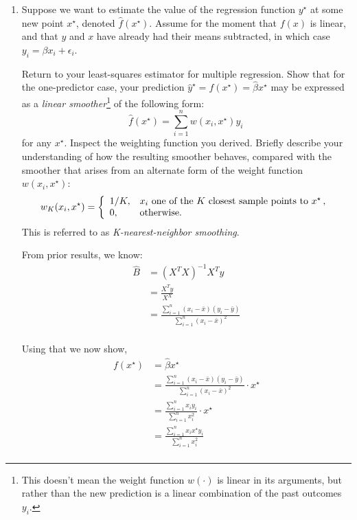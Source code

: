 \documentclass{homework}
\newcommand{\1}{\mathbf{1}}
\begin{document}
\begin{enumerate}[label=(\Alph*)]
\item Suppose we want to estimate the value of the regression function $y^{\star}$ at some new point $x^\star$, denoted $\hat{f}(x^{\star})$.  Assume for the moment that $f(x)$ is linear, and that $y$ and $x$ have already had their means subtracted, in which case $y_i = \beta x_i + \epsilon_i$.

Return to your least-squares estimator for multiple regression.  Show that for the one-predictor case, your prediction $\hat{y}^{\star} = f(x^{\star}) = \hat{\beta} x^{\star}$ may be expressed as a \textit{linear smoother}\footnote{This doesn't mean the weight function $w(\cdot)$ is linear in its arguments, but rather than the new prediction is a linear combination of the past outcomes $y_i$.} of the following form:
$$
\hat{f}(x^{\star}) =  \sum_{i=1}^n w(x_i, x^{\star}) y_i   \, 
$$
for any $x^{\star}$.  Inspect the weighting function you derived.  Briefly describe your understanding of how the resulting smoother behaves, compared with the smoother that arises from an alternate form of the weight function $w(x_i, x^{\star})$:
$$
w_K(x_i, x^{\star}) = \left \{
\begin{array}{l l}
1/K, & \mbox{$x_i$ one of the $K$ closest sample points to $x^{\star}$} \, ,\\
0, & \mbox{otherwise.} \\
\end{array}
\right.
$$
This is referred to as \textit{K-nearest-neighbor smoothing}.
\\
\par From prior results, we know: 
\begin{equation} \begin{split}
\hat{B} &= (X^TX)^{-1}X^T y\\
&= \frac{ X^Ty }{X^X} \\
&= \frac{ \sum_{i=1}^n{(x_i - \bar{x})(y_i - \bar{y})}}{ \sum_{i=1}^n{(x_i - \bar{x})^2 }} \\
\end{split}\end{equation}

\par Using that we now show,
\begin{equation} \begin{split}
f(x^{\star}) &= \hat{\beta} x^{\star}\\
&= \frac{ \sum_{i=1}^n{(x_i - \bar{x})(y_i - \bar{y})}}{ \sum_{i=1}^n{(x_i - \bar{x})^2 }} \cdot x^{\star}\\
&= \frac{ \sum_{i=1}^n{x_i y_i }}{ \sum_{i=1}^n{x_i^2 }} \cdot x^{\star}\\
&= \frac{ \sum_{i=1}^n{x_i x^{\star} y_i }}{ \sum_{i=1}^n{x_i^2 }} \\
\end{split}\end{equation}


\end{enumerate}
\end{document}
